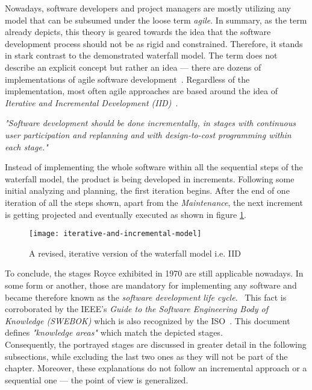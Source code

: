 \documentclass[12pt,a4paper,twoside]{report}
\begin{document}
Nowadays, software developers and project managers are mostly utilizing any model that
can be subsumed under the loose term \textit{agile}.
In summary, as the term already depicts, this theory is geared towards
the idea that the software development process should not be as rigid and constrained.
Therefore, it stands in stark contrast to the demonstrated waterfall model.
The term does not describe an explicit concept but rather an idea ---
there are dozens of implementations of agile software development~\cite{martin-agile-practices}.
Regardless of the implementation, most often agile approaches are based around
the idea of \textit{Iterative and Incremental Development (IID)}~\cite{larman-iid-history}.
\begin{displayquote}
\emph{"Software development should be done incrementally, in stages with
continuous user participation and replanning and
with design-to-cost programming within each stage."}~\cite{mills-iid}
\end{displayquote}
Instead of implementing the whole software within all the sequential steps
of the waterfall model, the product is being developed in increments.
Following some initial analyzing and planning, the first iteration begins.
After the end of one iteration of all the steps shown, apart from the \textit{Maintenance},
the next increment is getting projected and eventually executed as shown in figure \ref{fig:idd-model}.
\begin{figure}[htbp]
\centering
\texttt{[image: iterative-and-incremental-model]}
\caption{A revised, iterative version of the waterfall model i.e. IID}
\label{fig:idd-model}
\end{figure}

To conclude, the stages Royce exhibited in 1970 are still applicable nowadays.
In some form or another, those are mandatory for implementing any software
and became therefore known as the \textit{software development life cycle}.~\cite{se-ieee}
This fact is corroborated by the IEEE's
\textit{Guide to the Software Engineering Body of Knowledge (SWEBOK)}
which is also recognized by the ISO~\cite{swebok}.
This document defines \textit{"knowledge areas"} which match the depicted stages.\\
Consequently, the portrayed stages are discussed in greater detail in the following subsections,
while excluding the last two ones as they will not be part of the
\textit{} chapter.
Moreover, these explanations do not follow an incremental approach
or a sequential one --- the point of view is generalized.
\end{document}

